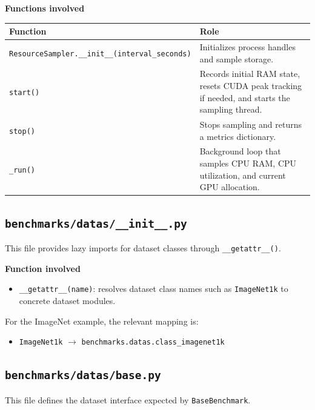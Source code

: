 \documentclass[11pt]{article}
\begin{document}
\textbf{Functions involved}
\begin{longtable}{>{\ttfamily}p{}p{}}
\textnormal{Function} & \textnormal{Role} \\
\hline
\texttt{ResourceSampler.\_\_init\_\_(interval\_seconds)} & Initializes process handles and sample storage. \\
\texttt{start()} & Records initial RAM state, resets CUDA peak tracking if needed, and starts the sampling thread. \\
\texttt{stop()} & Stops sampling and returns a metrics dictionary. \\
\texttt{\_run()} & Background loop that samples CPU RAM, CPU utilization, and current GPU allocation. \\
\end{longtable}

\subsection*{\texttt{benchmarks/datas/\_\_init\_\_.py}}
This file provides lazy imports for dataset classes through \texttt{\_\_getattr\_\_()}.

\textbf{Function involved}
\begin{itemize}[leftmargin=*]
    \item \texttt{\_\_getattr\_\_(name)}: resolves dataset class names such as \texttt{ImageNet1k} to concrete dataset modules.
\end{itemize}

For the ImageNet example, the relevant mapping is:
\begin{itemize}[leftmargin=*]
    \item \texttt{ImageNet1k} $\rightarrow$ \texttt{benchmarks.datas.class\_imagenet1k}
\end{itemize}

\subsection*{\texttt{benchmarks/datas/base.py}}
This file defines the dataset interface expected by \texttt{BaseBenchmark}.
\end{document}
